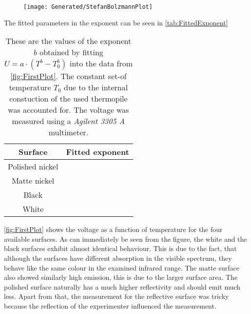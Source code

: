 \documentclass[a4paper,10pt,twocolumn]{article}
\begin{document}
    \begin{figure}
               \begin{center}
               \texttt{[image: Generated/StefanBolzmannPlot]}
               \caption{}
               \label{fig:FirstPlot}
               \end{center}
    \end{figure}
    The fitted parameters in the exponent can be seen in \autoref{tab:FittedExponent}
    \begin{table}[htbp]          %
        \centering
        \begin{tabular*}{0.9\linewidth}{@{\extracolsep{\fill}}cc}
            \hline
            \hline
            \rule[-7pt]{0pt}{23pt}  Surface  &  Fitted exponent 	 \\
            \hline
            \rule[-5pt]{0pt}{23pt}   Polished nickel   &   \ExponentPolished  	 \\
            \rule[-5pt]{0pt}{23pt}   Matte nickel   & \ExponentMatt     	 \\
            \rule[-5pt]{0pt}{23pt}   Black  &   \ExponentBlack  	 \\
            \rule[-5pt]{0pt}{23pt}   White   &   \ExponentWhite  	 \\
            \hline
            \hline
        \end{tabular*}
        \normalsize
        \caption[]{These are the values of the exponent $b$ obtained by fitting $U = a\cdot(T^b - T_0^b) $ into the data from \autoref{fig:FirstPlot}.
        The constant set-of temperature $T_0$ due to the internal constuction of the used thermopile was accounted for.
        The voltage was measured using a \textit{Agilent 3305 A} multimeter.}  %
        \label{tab:FittedExponent}                             %
    \end{table}
    \autoref{fig:FirstPlot} shows the voltage as a function of temperature for the four available surfaces.
    As can immediately be seen from the figure, the white and the black surfaces exhibit almost identical behaviour.
    This is due to the fact, that although the surfaces have different absorption in the visible spectrum, they behave like the same colour in the examined infrared range.
    The matte surface also showed similarly high emission, this is due to the larger surface area.
    The polished surface naturally has a much higher reflectivity and should emit much less.
    Apart from that, the measurement for the reflective surface was tricky because the reflection of the experimenter influenced the measurement.
\end{document}
